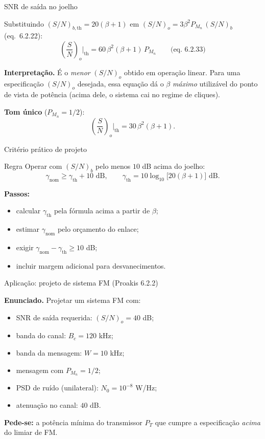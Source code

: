 \begin{frame}{SNR de saída no joelho}

Substituindo $(S/N)_{b,\text{th}} = 20(\beta + 1)$ em $(S/N)_o = 3\beta^2 P_{M_n}\, (S/N)_b$ (eq.~6.2.22):
\[
\boxed{\left(\frac{S}{N}\right)_o\bigg|_{\text{th}} = 60\,\beta^2(\beta + 1)\, P_{M_n}}
\qquad \text{(eq.~6.2.33)}
\]

\textbf{Interpretação.} É o \emph{menor} $(S/N)_o$ obtido em operação linear. Para uma especificação $(S/N)_o$ desejada, essa equação dá o $\beta$ \emph{máximo} utilizável do ponto de vista de potência (acima dele, o sistema cai no regime de cliques).

\textbf{Tom único} ($P_{M_n} = 1/2$):
\[
\left(\frac{S}{N}\right)_o\bigg|_{\text{th}} = 30\,\beta^2(\beta + 1).
\]

\end{frame}


\begin{frame}{Critério prático de projeto}

\begin{block}{Regra}
Operar com $(S/N)_b$ pelo menos $10$ dB acima do joelho:
\[
\gamma_{\text{nom}} \ge \gamma_{\text{th}} + 10 \text{ dB}, \qquad
\gamma_{\text{th}} = 10\log_{10}\!\bigl[20(\beta+1)\bigr]\text{ dB}.
\]
\end{block}

\textbf{Passos:}
\begin{itemize}
\item calcular $\gamma_{\text{th}}$ pela fórmula acima a partir de $\beta$;
\item estimar $\gamma_{\text{nom}}$ pelo orçamento do enlace;
\item exigir $\gamma_{\text{nom}} - \gamma_{\text{th}} \ge 10$ dB;
\item incluir margem adicional para desvanecimentos.
\end{itemize}

\end{frame}


\begin{frame}{Aplicação: projeto de sistema FM (Proakis 6.2.2)}

\textbf{Enunciado.} Projetar um sistema FM com:
\begin{itemize}
\item SNR de saída requerida: $(S/N)_o = 40$ dB;
\item banda do canal: $B_c = 120$ kHz;
\item banda da mensagem: $W = 10$ kHz;
\item mensagem com $P_{M_n} = 1/2$;
\item PSD de ruído (unilateral): $N_0 = 10^{-8}$ W/Hz;
\item atenuação no canal: $40$ dB.
\end{itemize}

\textbf{Pede-se:} a potência mínima do transmissor $P_T$ que cumpre a especificação \emph{acima} do limiar de FM.

\end{frame}


